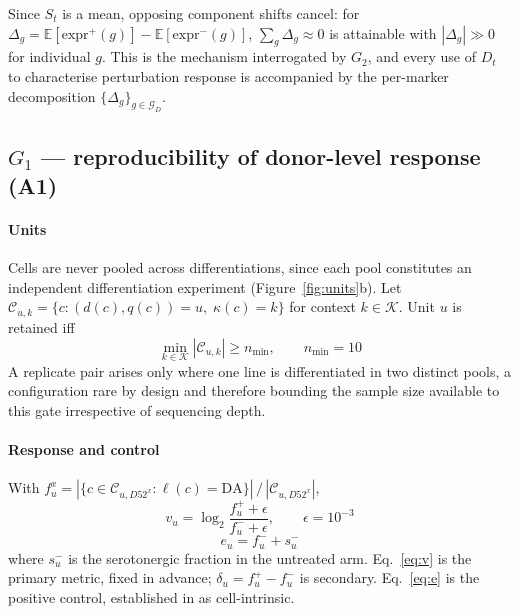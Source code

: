 \documentclass[5p,times,twocolumn]{elsarticle}
\begin{document}
Since $S_t$ is a mean, opposing component shifts cancel: for
$\Delta_g = \mathbb{E}[\mathrm{expr}^+(g)] - \mathbb{E}[\mathrm{expr}^-(g)]$,
$\sum_g \Delta_g \approx 0$ is attainable with $|\Delta_g| \gg 0$ for individual
$g$. This is the mechanism interrogated by $G_2$, and every use of $D_t$ to
characterise perturbation response is accompanied by the per-marker
decomposition $\{\Delta_g\}_{g\in\mathcal{G}_D}$.

\subsection{\textbf{$G_1$ --- reproducibility of donor-level response (A1)}}
\label{sec:gate2}

\paragraph{\textbf{Units}} Cells are never pooled across differentiations, since
each pool constitutes an independent differentiation experiment
(Figure~\ref{fig:units}b). Let
$\mathcal{C}_{u,k}=\{c : (d(c),q(c))=u,\; \kappa(c)=k\}$ for context
$k\in\mathcal{K}$. Unit $u$ is retained iff
\begin{equation}
\min_{k\in\mathcal{K}} |\mathcal{C}_{u,k}| \geq n_{\min}, \qquad n_{\min}=10
\end{equation}
A replicate pair arises only where one line is differentiated in two distinct
pools, a configuration rare by design and therefore bounding the sample size
available to this gate irrespective of sequencing depth.

\paragraph{\textbf{Response and control}} With
$f_u^{x} = |\{c\in\mathcal{C}_{u,D52^x} : \ell(c)=\mathrm{DA}\}| \,/\,
|\mathcal{C}_{u,D52^x}|$,
\begin{equation}
v_u = \log_2\!\frac{f_u^{+}+\epsilon}{f_u^{-}+\epsilon},
\qquad \epsilon = 10^{-3}
\label{eq:v}
\end{equation}
\begin{equation}
e_u = f_u^{-} + s_u^{-}
\label{eq:e}
\end{equation}
where $s_u^{-}$ is the serotonergic fraction in the untreated arm.
Eq.~\eqref{eq:v} is the primary metric, fixed in advance;
$\delta_u = f_u^{+}-f_u^{-}$ is secondary. Eq.~\eqref{eq:e} is the positive
control, established in \cite{jerber2021population} as cell-intrinsic.
\end{document}
